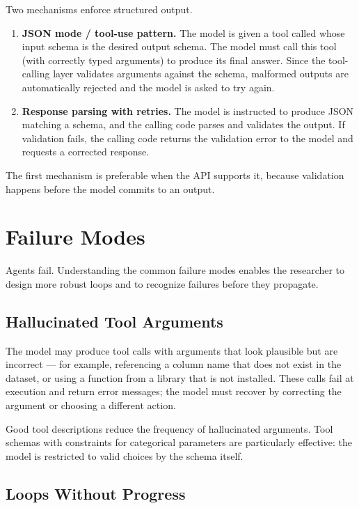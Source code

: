 Two mechanisms enforce structured output.

\begin{enumerate}
\item \textbf{JSON mode / tool-use pattern.}
The model is given a tool called  whose input schema is the desired output schema.
The model must call this tool (with correctly typed arguments) to produce its final answer.
Since the tool-calling layer validates arguments against the schema, malformed outputs are automatically rejected and the model is asked to try again.

\item \textbf{Response parsing with retries.}
The model is instructed to produce JSON matching a schema, and the calling code parses and validates the output.
If validation fails, the calling code returns the validation error to the model and requests a corrected response.
\end{enumerate}

The first mechanism is preferable when the API supports it, because validation happens before the model commits to an output.

\section{Failure Modes}
\label{section:FailureModes}

Agents fail.
Understanding the common failure modes enables the researcher to design more robust loops and to recognize failures before they propagate.

\subsection{Hallucinated Tool Arguments}

The model may produce tool calls with arguments that look plausible but are incorrect — for example, referencing a column name that does not exist in the dataset, or using a function from a library that is not installed.
These calls fail at execution and return error messages; the model must recover by correcting the argument or choosing a different action.

Good tool descriptions reduce the frequency of hallucinated arguments.
Tool schemas with  constraints for categorical parameters are particularly effective: the model is restricted to valid choices by the schema itself.

\subsection{Loops Without Progress}

